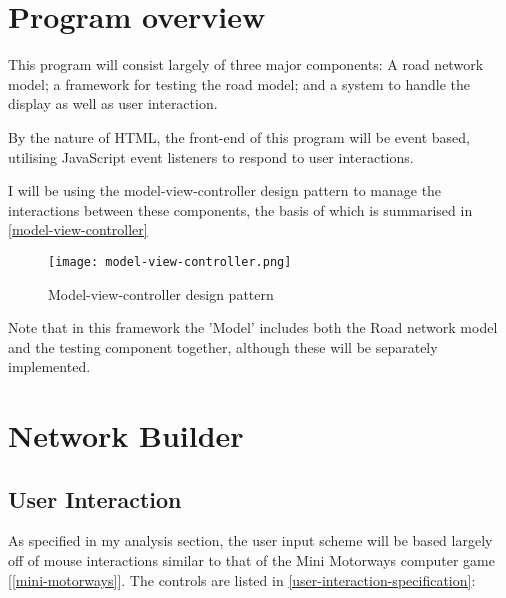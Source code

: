 \section{Program overview}

    This program will consist largely of three major components: A road network model; a framework for testing the road model; and a system to handle the display as well as user interaction.

    By the nature of HTML, the front-end of this program will be event based, utilising JavaScript event listeners to respond to user interactions.

    I will be using the model-view-controller design pattern to manage the interactions between these components, the basis of which is summarised in \autoref{model-view-controller}

    \begin{figure}
        \centering
        \texttt{[image: model-view-controller.png]}
        \caption{Model-view-controller design pattern}
        \label{model-view-controller}
    \end{figure}

    Note that in this framework the 'Model' includes both the Road network model and the testing component together, although these will be separately implemented.

\section{Network Builder}

    \subsection{User Interaction}
    \label{subsection:user-interaction}

        As specified in my analysis section, the user input scheme will be based largely off of mouse interactions similar to that of the Mini Motorways computer game [\autoref{mini-motorways}]. The controls are listed in \autoref{user-interaction-specification}:

